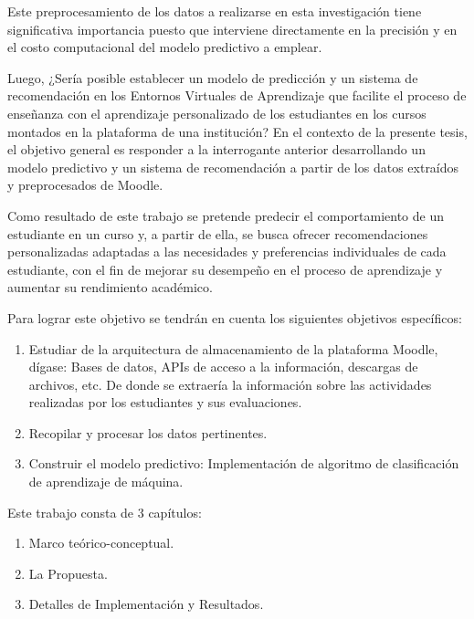 Este preprocesamiento de los datos a realizarse en esta investigación tiene significativa importancia puesto que 
interviene directamente en la precisión y en el costo computacional del modelo predictivo a emplear.

Luego, ¿Sería posible establecer un modelo de predicción y un sistema de recomendación en los 
Entornos Virtuales de Aprendizaje que facilite el proceso de enseñanza con el aprendizaje personalizado de los 
estudiantes en los cursos montados en la plataforma de una institución? 
En el contexto de la presente tesis, el objetivo general es responder a la interrogante anterior desarrollando 
un modelo predictivo y un sistema de recomendación a partir de los datos extraídos y preprocesados de Moodle. 

Como resultado de este trabajo se pretende predecir el comportamiento de un estudiante en un 
curso y, a partir de ella, se busca ofrecer recomendaciones personalizadas adaptadas a las 
necesidades y preferencias individuales de cada estudiante, con el fin de mejorar su 
desempeño en el proceso de aprendizaje y aumentar su rendimiento académico.

Para lograr este objetivo se tendrán en cuenta los siguientes objetivos específicos:
\begin{enumerate}
    \item Estudiar de la arquitectura de almacenamiento de la plataforma Moodle, dígase: Bases de datos, APIs de acceso a la información,
          descargas de archivos, etc. De donde se extraería la información sobre las actividades realizadas por los estudiantes y sus evaluaciones.
    \item Recopilar y procesar los datos pertinentes.
    \item Construir el modelo predictivo: Implementación de algoritmo de clasificación de aprendizaje de máquina.
\end{enumerate}

Este trabajo consta de 3 capítulos:
\begin{enumerate}
    \item Marco teórico-conceptual.
    \item La Propuesta.
    \item Detalles de Implementación y Resultados.
\end{enumerate}




